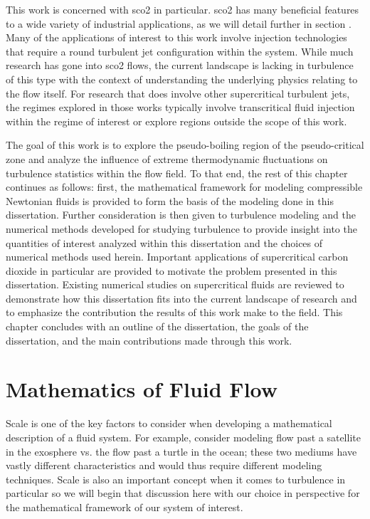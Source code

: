 This work is concerned with \gls{sco2} in particular. \gls{sco2} has many beneficial features to a wide variety of industrial applications, as we will detail further in section \cite{}. Many of the applications of interest to this work involve injection technologies that require a round turbulent jet configuration within the system. While much research has gone into \gls{sco2} flows, the current landscape is lacking in turbulence of this type with the context of understanding the underlying physics relating to the flow itself. For research that does involve other supercritical turbulent jets, the regimes explored in those works typically involve transcritical fluid injection within the regime of interest or explore regions outside the scope of this work. 

The goal of this work is to explore the pseudo-boiling region of the pseudo-critical zone and analyze the influence of extreme thermodynamic fluctuations on turbulence statistics within the flow field. To that end, the rest of this chapter continues as follows: first, the mathematical framework for modeling compressible Newtonian fluids is provided to form the basis of the modeling done in this dissertation. Further consideration is then given to turbulence modeling and the numerical methods developed for studying turbulence to provide insight into the quantities of interest analyzed within this dissertation and the choices of numerical methods used herein. Important applications of supercritical carbon dioxide in particular are provided to motivate the problem presented in this dissertation. Existing numerical studies on supercritical fluids are reviewed to demonstrate how this dissertation fits into the current landscape of research and to emphasize the contribution the results of this work make to the field. This chapter concludes with an outline of the dissertation, the goals of the dissertation, and the main contributions made through this work. 

\section{Mathematics of Fluid Flow}

Scale is one of the key factors to consider when developing a mathematical description of a fluid system. For example, consider modeling flow past a satellite in the exosphere vs. the flow past a turtle in the ocean; these two mediums have vastly different characteristics and would thus require different modeling techniques. Scale is also an important concept when it comes to turbulence in particular so we will begin that discussion here with our choice in perspective for the mathematical framework of our system of interest.

